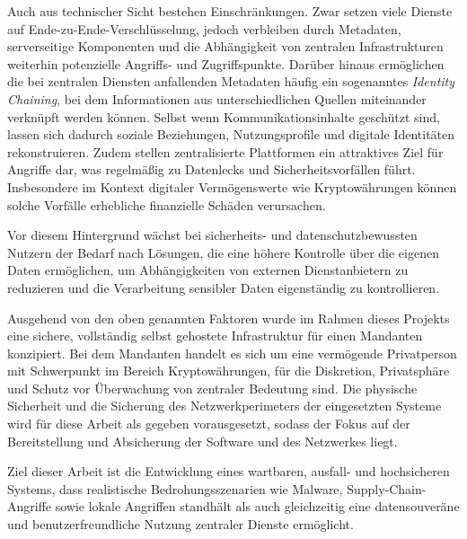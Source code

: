 Auch aus technischer Sicht bestehen Einschränkungen. Zwar setzen viele Dienste auf Ende-zu-Ende-Verschlüsselung, jedoch verbleiben durch Metadaten, serverseitige Komponenten und die Abhängigkeit von zentralen Infrastrukturen weiterhin potenzielle Angriffs- und Zugriffspunkte.\cite{landau_metadata_2020} Darüber hinaus ermöglichen die bei zentralen Diensten anfallenden Metadaten häufig ein sogenanntes \textit{Identity Chaining}, bei dem Informationen aus unterschiedlichen Quellen miteinander verknüpft werden können.\cite{landau_metadata_2020,gao_identity_linkage_2022} Selbst wenn Kommunikationsinhalte geschützt sind, lassen sich dadurch soziale Beziehungen, Nutzungsprofile und digitale Identitäten rekonstruieren. Zudem stellen zentralisierte Plattformen ein attraktives Ziel für Angriffe dar, was regelmäßig zu Datenlecks und Sicherheitsvorfällen führt.\cite{verizon_dbir_2025} Insbesondere im Kontext digitaler Vermögenswerte wie Kryptowährungen können solche Vorfälle erhebliche finanzielle Schäden verursachen.\cite{chainalysis_crypto_theft_2025}

Vor diesem Hintergrund wächst bei sicherheits- und datenschutzbewussten Nutzern der Bedarf nach Lösungen, die eine höhere Kontrolle über die eigenen Daten ermöglichen, um Abhängigkeiten von externen Dienstanbietern zu reduzieren und die Verarbeitung sensibler Daten eigenständig zu kontrollieren.

Ausgehend von den oben genannten Faktoren wurde im Rahmen dieses Projekts eine sichere, vollständig selbst gehostete Infrastruktur für einen Mandanten konzipiert. Bei dem Mandanten handelt es sich um eine vermögende Privatperson mit Schwerpunkt im Bereich Kryptowährungen, für die Diskretion, Privatsphäre und Schutz vor Überwachung von zentraler Bedeutung sind. Die physische Sicherheit und die Sicherung des Netzwerkperimeters der eingesetzten Systeme wird für diese Arbeit als gegeben vorausgesetzt, sodass  der Fokus auf der Bereitstellung und Absicherung der Software und des Netzwerkes liegt.

Ziel dieser Arbeit ist die Entwicklung eines wartbaren, ausfall- und hochsicheren Systems, dass realistische Bedrohungsszenarien wie Malware, Supply-Chain-Angriffe sowie lokale Angriffen standhält als auch gleichzeitig eine datensouveräne und benutzerfreundliche Nutzung zentraler Dienste ermöglicht. 

